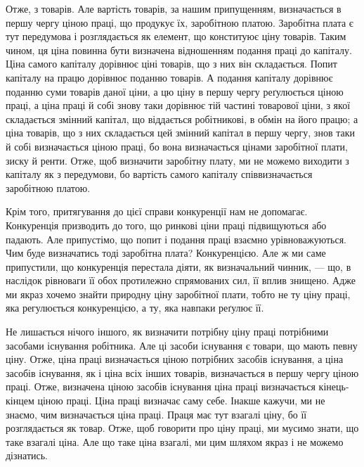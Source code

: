 \parcont{}  %
Отже, з товарів. Але вартість товарів, за нашим припущенням, визначається
в першу чергу ціною праці, що продукує їх, заробітною платою. Заробітна плата
є тут передумова і розглядається як елемент, що конституює ціну товарів. Таким
чином, ця ціна повинна бути визначена відношенням подання праці до капіталу.
Ціна самого капіталу дорівнює ціні товарів, що з них він складається. Попит
капіталу на працю дорівнює поданню товарів. А подання капіталу дорівнює
поданню суми товарів даної ціни, а цю ціну в першу чергу реґулюється
ціною праці, а ціна праці й собі знову таки дорівнює тій частині товарової
ціни, з якої складається змінний капітал, що віддається робітникові, в
обмін на його працю; а ціна товарів, що з них складається цей змінний капітал
в першу чергу, знов таки й собі визначається ціною праці, бо вона визначається
цінами заробітної плати, зиску й ренти. Отже, щоб визначити заробітну плату,
ми не можемо виходити з капіталу як з передумови, бо вартість самого капіталу
співвизначається заробітною платою.

Крім того, притягування до цієї справи конкуренції нам не допомагає.
Конкуренція призводить до того, що ринкові ціни праці підвищуються
або падають. Але припустімо, що попит і подання праці взаємно урівноважуються.
Чим буде визначатись тоді заробітна плата? Конкуренцією. Але ж
ми саме припустили, що конкуренція перестала діяти, як визначальний чинник,
— що, в наслідок рівноваги її обох протилежно спрямованих сил, її вплив
знищено. Адже ми якраз хочемо знайти природну ціну заробітної плати,
тобто не ту ціну праці, яка регулюється конкуренцією, а ту, яка навпаки
реґулює її.

Не лишається нічого іншого, як визначити потрібну ціну праці потрібними
засобами існування робітника. Але ці засоби існування є товари, що мають
певну ціну. Отже, ціна праці визначається ціною потрібних засобів існування,
а ціна засобів існування, як і ціна всіх інших товарів, визначається в першу
чергу ціною праці. Отже, визначена ціною засобів існування ціна праці визначається
кінець-кінцем ціною праці. Ціна праці визначає саму себе. Інакше кажучи,
ми не знаємо, чим визначається ціна праці. Праця має тут взагалі ціну,
бо її розглядається як товар. Отже, щоб говорити про ціну праці, ми мусимо
знати, що таке взагалі ціна. Але що таке ціна взагалі, ми цим шляхом якраз
і не можемо дізнатись.

